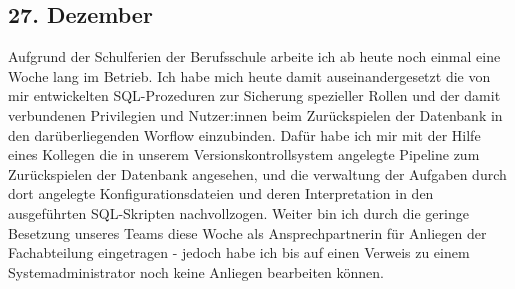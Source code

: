 \subsection{27. Dezember}
Aufgrund der Schulferien der Berufsschule arbeite ich ab heute noch einmal eine Woche lang im Betrieb. Ich habe mich heute damit auseinandergesetzt die von mir entwickelten SQL-Prozeduren zur Sicherung spezieller Rollen und der damit verbundenen Privilegien und Nutzer:innen beim Zurückspielen der Datenbank in den darüberliegenden Worflow einzubinden. Dafür habe ich mir mit der Hilfe eines Kollegen die in unserem Versionskontrollsystem angelegte Pipeline zum Zurückspielen der Datenbank angesehen, und die verwaltung der Aufgaben durch dort angelegte Konfigurationsdateien und deren Interpretation in den ausgeführten SQL-Skripten nachvollzogen. Weiter bin ich durch die geringe Besetzung unseres Teams diese Woche als Ansprechpartnerin für Anliegen der Fachabteilung eingetragen -  jedoch habe ich bis auf einen Verweis zu einem Systemadministrator noch keine Anliegen bearbeiten können.